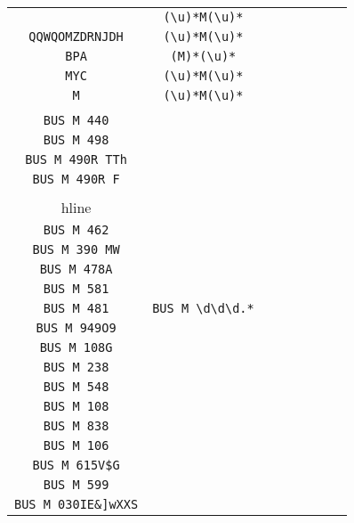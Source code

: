 \begin{longtable}{cccccccc}
\begin{tabular}{ll}
    \verb|KM| & \verb|(\u)*M(\u)*|\\
\verb|QQWQOMZDRNJDH| & \verb|(\u)*M(\u)*|\\
\verb|BPA| & \verb|(M)*(\u)*|\\
\verb|MYC| & \verb|(\u)*M(\u)*|\\
\verb|M| & \verb|(\u)*M(\u)*|
\end{tabular}
\\\midrule 
\begin{tabular}{l}
    \verb|BUS M 277|\\
\verb|BUS M 440|\\
\verb|BUS M 498|\\
\verb|BUS M 490R TTh|\\
\verb|BUS M 490R F|\\
\\hline\\
\verb|BUS M 462|\\
\verb|BUS M 390 MW|\\
\verb|BUS M 478A|\\
\verb|BUS M 581|\\
\verb|BUS M 481|
\end{tabular}

&
\verb|BUS M \d\d\d.*|
&

\begin{tabular}{l}
    \verb|BUS M \d\d\d(.)*|\\
\verb|BUS M 949O9|\\
\verb|BUS M 108G|\\
\verb|BUS M 238|\\
\verb|BUS M 548|\\
\verb|BUS M 108|
\end{tabular}

&

\begin{tabular}{l}
    \verb|BUS M \d\d\d(\u(.)*)*|\\
\verb|BUS M 838|\\
\verb|BUS M 106|\\
\verb|BUS M 615V$G|\\
\verb|BUS M 599|\\
\verb|BUS M 030IE&]wXXS|
\end{tabular}

&


\end{longtable}
